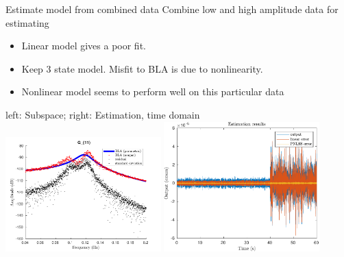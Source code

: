\documentclass[9pt]{beamer}
\begin{document}
\begin{frame}{Estimate model from combined data}
  Combine low and high amplitude data for estimating
  \begin{itemize}
  \item Linear model gives a poor fit.
  \item Keep 3 state model. Misfit to BLA is due to nonlinearity.
  \item Nonlinear model seems to perform well on this particular data
  \end{itemize}
  \begin{center}
    left: Subspace; right: Estimation, time domain\\
    \includegraphics[width=0.45\textwidth]{fig/PNLSS_comb_BLA_parnonpar}
    \includegraphics[width=0.45\textwidth]{fig/PNLSS_comb_TDOMRES}
  \end{center}
\end{frame}
\end{document}
